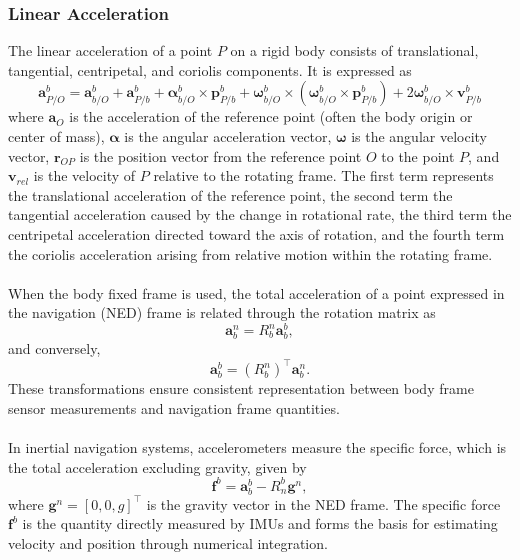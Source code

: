 \subsubsection{Linear Acceleration}
The linear acceleration of a point $P$ on a rigid body consists of translational, tangential, centripetal, and coriolis components. It is expressed as
$$
    \mathbf{a}_{P/O}^{b} =
    \mathbf{a}_{b/O}^{b}
    + \mathbf{a}_{P/b}^{b}
    + \boldsymbol{\alpha}_{b/O}^{b} \times \mathbf{p}_{P/b}^{b}
    + \boldsymbol{\omega}_{b/O}^{b} \times (\boldsymbol{\omega}_{b/O}^{b} \times \mathbf{p}_{P/b}^{b})
    + 2\boldsymbol{\omega}_{b/O}^{b} \times \mathbf{v}_{P/b}^{b}
$$
where $\mathbf{a}_O$ is the acceleration of the reference point (often the body origin or center of mass), $\boldsymbol{\alpha}$ is the angular acceleration vector, $\boldsymbol{\omega}$ is the angular velocity vector, $\mathbf{r}_{OP}$ is the position vector from the reference point $O$ to the point $P$, and $\mathbf{v}_{rel}$ is the velocity of $P$ relative to the rotating frame. The first term represents the translational acceleration of the reference point, the second term the tangential acceleration caused by the change in rotational rate, the third term the centripetal acceleration directed toward the axis of rotation, and the fourth term the coriolis acceleration arising from relative motion within the rotating frame.  
\\ \\
When the body fixed frame is used, the total acceleration of a point expressed in the navigation (NED) frame is related through the rotation matrix as
$$
    \mathbf{a}_b^n = R_b^n \mathbf{a}_b^b,
$$
and conversely,
$$
    \mathbf{a}_b^b = (R_b^n)^\top \mathbf{a}_b^n.
$$
These transformations ensure consistent representation between body frame sensor measurements and navigation frame quantities.  
\\ \\
In inertial navigation systems, accelerometers measure the specific force, which is the total acceleration excluding gravity, given by
$$
    \mathbf{f}^b = \mathbf{a}_b^b - R_n^b \mathbf{g}^n,
$$
where $\mathbf{g}^n = [0, 0, g]^\top$ is the gravity vector in the NED frame. The specific force $\mathbf{f}^b$ is the quantity directly measured by IMUs and forms the basis for estimating velocity and position through numerical integration.



